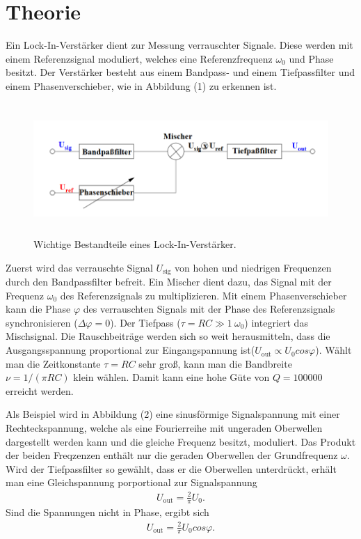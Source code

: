 \section{Theorie}
\label{sec:Theorie}

Ein Lock-In-Verstärker dient zur Messung verrauschter Signale. 
Diese werden mit einem Referenzsignal moduliert, welches eine Referenzfrequenz $\omega_0$ und Phase besitzt.
Der Verstärker besteht aus einem Bandpass- und einem Tiefpassfilter und einem Phasenverschieber, wie in Abbildung (1) zu erkennen ist.

\begin{figure}[H]
  \centering
  \includegraphics[height=5cm]{theorie.png}
  \caption{Wichtige Bestandteile eines Lock-In-Verstärker. \cite[S. 1]{l}}
\end{figure}

\noindent Zuerst wird das verrauschte Signal $U_\text{sig}$ von hohen und niedrigen Frequenzen durch den Bandpassfilter befreit.
Ein Mischer dient dazu, das Signal mit der Frequenz $\omega_0$ des Referenzsignals zu multiplizieren.
Mit einem Phasenverschieber kann die Phase $\varphi$ des verrauschten Signals mit der Phase des Referenzsignals synchronisieren ($\Delta \varphi = 0$).
Der Tiefpass ($\tau = RC \gg 1\ \omega_0 $) integriert das Mischsignal.
Die Rauschbeiträge werden sich so weit herausmitteln, dass die Ausgangsspannung proportional zur Eingangspannung ist($U_\text{out} \propto U_0 cos\varphi $).
Wählt man die Zeitkonstante $\tau = RC$ sehr groß, kann man die Bandbreite $\nu = 1/(\pi RC)$ klein wählen.
Damit kann eine hohe Güte von $Q = 100000$ erreicht werden.

\noindent Als Beispiel wird in Abbildung (2) eine sinusförmige Signalspannung mit einer Rechteckspannung, welche als eine Fourierreihe mit ungeraden Oberwellen dargestellt werden kann und die gleiche Frequenz besitzt, moduliert.
Das Produkt der beiden Freqzenzen enthält nur die geraden Oberwellen der Grundfrequenz $\omega$. 
Wird der Tiefpassfilter so gewählt, dass er die Oberwellen unterdrückt, erhält man eine Gleichspannung porportional zur Signalspannung
\begin{align}
U_\text{out} = \frac{2}{\pi} U_0 .
\end{align}
Sind die Spannungen nicht in Phase, ergibt sich
\begin{align}
U_\text{out} = \frac{2}{\pi} U_0 cos \varphi .
\end{align}

